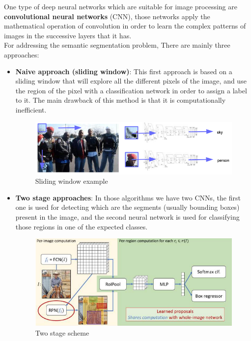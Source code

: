 \documentclass{article}
\begin{document}
One type of deep neural networks which are suitable for image processing are \textbf{convolutional neural networks} (CNN), those networks apply the mathematical operation of convolution in order to learn the complex patterns of images in the successive layers that it has. \\

For addressing the semantic segmentation problem, There are mainly three approaches:

\begin{itemize}
    \item \textbf{Naive approach (sliding window)}: This first approach is based on a sliding window that will explore all the different pixels of the image, and use the region of the pixel with a classification network in order to assign a label to it. The main drawback of this method is that it is computationally inefficient.
    \begin{figure}[H]
        \centering
        \includegraphics[scale=0.4]{report/exam/images/sliding-window.png}
        \caption{Sliding window example}
        \label{fig:my_label}
    \end{figure}
    
    \item \textbf{Two stage approaches}: In those algorithms we have two CNNs, the first one is used for detecting which are the segments (usually bounding boxes) present in the image, and the second neural network is used for classifying those regions in one of the expected classes.
    \begin{figure}[H]
        \centering
        \includegraphics[scale=0.3]{report/exam/images/two-stage.png}
        \caption{Two stage scheme}
        \label{fig:my_label}
    \end{figure}
    

\end{itemize}
\end{document}
